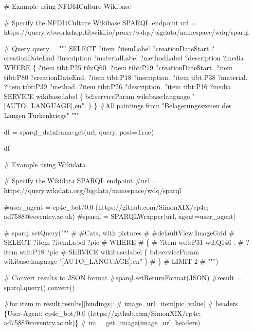 \documentclass[
  letterpaper,
  DIV=11,
  numbers=noendperiod]{scrreprt}
\newenvironment{Shaded}{\begin{snugshade}}{\end{snugshade}}
\newcommand{\CommentTok}[1]{\textcolor[rgb]{0.37,0.37,0.37}{#1}}
\newcommand{\NormalTok}[1]{\textcolor[rgb]{0.00,0.23,0.31}{#1}}
\newcommand{\OperatorTok}[1]{\textcolor[rgb]{0.37,0.37,0.37}{#1}}
\newcommand{\StringTok}[1]{\textcolor[rgb]{0.13,0.47,0.30}{#1}}
\newcommand{\VariableTok}[1]{\textcolor[rgb]{0.07,0.07,0.07}{#1}}
\begin{document}
\begin{Shaded}
\begin{Highlighting}[]
\CommentTok{\# Example using NFDI4Culture Wikibase}

\CommentTok{\# Specify the NFDI4Culture Wikibase SPARQL endpoint}
\NormalTok{url }\OperatorTok{=} \StringTok{\textquotesingle{}https://query.wbworkshop.tibwiki.io/proxy/wdqs/bigdata/namespace/wdq/sparql\textquotesingle{}}

\CommentTok{\# Query}
\NormalTok{query }\OperatorTok{=} \StringTok{"""}
\StringTok{SELECT ?item ?itemLabel ?creationDateStart ?creationDateEnd ?inscription ?materialLabel ?methodLabel ?description ?media}
\StringTok{WHERE \{ }
\StringTok{    ?item tibt:P25 tib:Q60.}
\StringTok{    ?item tibt:P79 ?creationDateStart.}
\StringTok{    ?item tibt:P80 ?creationDateEnd.}
\StringTok{    ?item tibt:P18 ?inscription.}
\StringTok{    ?item tibt:P38 ?material.}
\StringTok{    ?item tibt:P39 ?method.}
\StringTok{    ?item tibt:P26 ?description.}
\StringTok{    ?item tibt:P16 ?media}
\StringTok{    SERVICE wikibase:label \{ bd:serviceParam wikibase:language "[AUTO\_LANGUAGE],en". \}}
\StringTok{\} }
\StringTok{\#All paintings from "Belagerungsszenen des Langen Türkenkriegs"}
\StringTok{"""}

\NormalTok{df }\OperatorTok{=}\NormalTok{ sparql\_dataframe.get(url, query, post}\OperatorTok{=}\VariableTok{True}\NormalTok{)}

\NormalTok{df}

\CommentTok{\# Example using Wikidata}

\CommentTok{\# Specify the Wikidata SPARQL endpoint}
\CommentTok{\#url = \textquotesingle{}https://query.wikidata.org/bigdata/namespace/wdq/sparql\textquotesingle{}}

\CommentTok{\#user\_agent = \textquotesingle{}cp4c\_bot/0.0 (https://github.com/SimonXIX/cp4c; ad7588@coventry.ac.uk)\textquotesingle{}}
\CommentTok{\#sparql = SPARQLWrapper(url, agent=user\_agent)}

\CommentTok{\# sparql.setQuery("""}
\CommentTok{\# \#Cats, with pictures}
\CommentTok{\# \#defaultView:ImageGrid}
\CommentTok{\# SELECT ?item ?itemLabel ?pic}
\CommentTok{\# WHERE}
\CommentTok{\# \{}
\CommentTok{\# ?item wdt:P31 wd:Q146 .}
\CommentTok{\# ?item wdt:P18 ?pic}
\CommentTok{\# SERVICE wikibase:label \{ bd:serviceParam wikibase:language "[AUTO\_LANGUAGE],en" \}}
\CommentTok{\# \}}
\CommentTok{\# LIMIT 2}
\CommentTok{\# """)}

\CommentTok{\# Convert results to JSON format}
\CommentTok{\#sparql.setReturnFormat(JSON)}
\CommentTok{\#result = sparql.query().convert()}

\CommentTok{\#for item in result[\textquotesingle{}results\textquotesingle{}][\textquotesingle{}bindings\textquotesingle{}]:}
    \CommentTok{\# image\_url=item[\textquotesingle{}pic\textquotesingle{}][\textquotesingle{}value\textquotesingle{}]}
    \CommentTok{\# headers = \{\textquotesingle{}User{-}Agent\textquotesingle{}: \textquotesingle{}cp4c\_bot/0.0 (https://github.com/SimonXIX/cp4c; ad7588@coventry.ac.uk)\textquotesingle{}\}}
    \CommentTok{\# im = get\_image(image\_url, headers)}


\end{Highlighting}
\end{Shaded}
\end{document}
